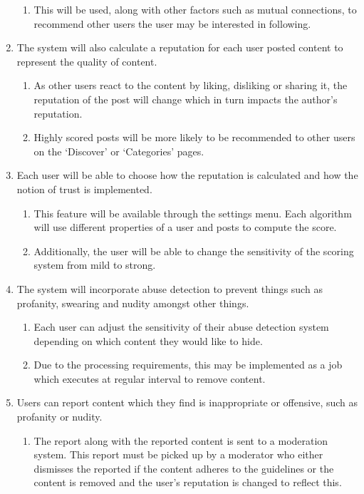 \begin{enumerate}[label=\textbf{F\arabic*}]
\begin{enumerate}
			\item This will be used, along with other factors such as mutual connections, to recommend other users the user may be interested in following.
		\end{enumerate}
	\item The system will also calculate a reputation for each user posted content to represent the quality of content.
		\begin{enumerate}
			\item As other users react to the content by liking, disliking or sharing it, the reputation of the post will change which in turn impacts the author's reputation.
			\item Highly scored posts will be more likely to be recommended to other users on the `Discover' or `Categories' pages.
		\end{enumerate}
	\item Each user will be able to choose how the reputation is calculated and how the notion of trust is implemented.
		\begin{enumerate}
			\item This feature will be available through the settings menu. Each algorithm will use different properties of a user and posts to compute the score.
			\item Additionally, the user will be able to change the sensitivity of the scoring system from mild to strong.
		\end{enumerate}
	\item The system will incorporate abuse detection to prevent things such as profanity, swearing and nudity amongst other things.
		\begin{enumerate}
			\item Each user can adjust the sensitivity of their abuse detection system depending on which content they would like to hide.
			\item Due to the processing requirements, this may be implemented as a job which executes at regular interval to remove content.
		\end{enumerate}
	\item Users can report content which they find is inappropriate or offensive, such as profanity or nudity.
		\begin{enumerate}
			\item The report along with the reported content is sent to a moderation system. This report must be picked up by a moderator who either dismisses the reported if the content adheres to the guidelines or the content is removed and the user's reputation is changed to reflect this.
		\end{enumerate}
\end{enumerate}

